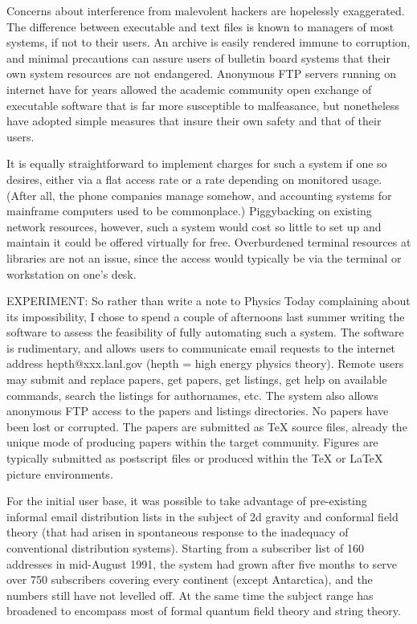 Concerns about interference from malevolent hackers are hopelessly exaggerated.
The difference between executable and text files is known to managers of
most systems, if not to their users. An archive is easily rendered immune
to corruption, and minimal precautions can assure users of bulletin board
systems that their own system resources are not endangered. Anonymous FTP
servers running on internet have for years allowed the academic community
open exchange of executable software that is far more susceptible to
malfeasance, but nonetheless have adopted simple measures that insure
their own safety and that of their users.

It is equally straightforward to implement charges for such a system if
one so desires, either via a flat access rate or a rate depending on
monitored usage. (After all, the phone companies manage somehow, and
accounting systems for mainframe computers used to be commonplace.)
Piggybacking on existing network resources, however, such a system would
cost so little to set up and maintain it could be offered virtually for
free. Overburdened terminal resources at libraries are not an issue, since
the access would typically be via the terminal or workstation on one's desk.

EXPERIMENT:\hfill\break
So rather than write a note to Physics Today complaining about its
impossibility, I chose to spend a couple of afternoons last summer writing
the software to assess the feasibility of fully automating such a system.
The software is rudimentary, and allows users to communicate email
requests to the internet address hepth@xxx.lanl.gov (hepth = high energy
physics theory). Remote users may submit and replace papers, get papers,
get listings, get help on available commands, search the listings for
authornames, etc. The system also allows anonymous FTP access to the
papers and listings directories. No papers have been lost or corrupted.
The papers are submitted as TeX source files, already the unique mode of
producing papers within the target community. Figures are typically
submitted as postscript files or produced within the TeX or LaTeX picture
environments.

For the initial user base, it was possible to take advantage of
pre-existing informal email distribution lists in the subject of 2d
gravity and conformal field theory (that had arisen in spontaneous
response to the inadequacy of conventional distribution systems). Starting
from a subscriber list of 160 addresses in mid-August 1991, the system had
grown after five months to serve over 750 subscribers covering every
continent (except Antarctica), and the numbers still have not levelled
off. At the same time the subject range has broadened to encompass most of
formal quantum field theory and string theory.

